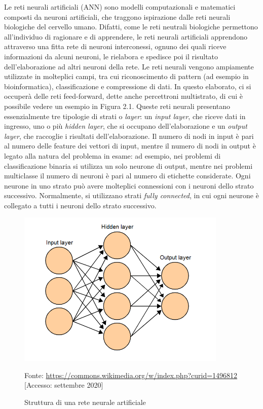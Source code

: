 \documentclass[11pt,  oneside, openany]{book}
\newcommand{\source}[1]{\caption*{Fonte: {#1}} }
\begin{document}
Le reti neurali artificiali (ANN) sono modelli computazionali e matematici composti da neuroni artificiali, che traggono ispirazione dalle reti neurali biologiche del cervello umano. Difatti, come le reti neutrali biologiche permettono all'individuo di ragionare e di apprendere, le reti neurali artificiali apprendono attraverso una fitta rete di neuroni interconessi, ognuno dei quali riceve informazioni da alcuni neuroni, le rielabora e spedisce poi il risultato dell'elaborazione ad altri neuroni della rete. Le reti neurali vengono ampiamente utilizzate in molteplici campi, tra cui riconoscimento di pattern (ad esempio in bioinformatica), classificazione e compressione di dati. In questo elaborato, ci si occuperà delle reti feed-forward, dette anche percettroni multistrato, di cui è possibile vedere  un esempio in Figura 2.1. Queste reti neurali presentano essenzialmente tre tipologie di strati o \textit{layer}: un \textit{input layer}, che riceve dati in ingresso, uno o più \textit{hidden layer}, che si occupano dell'elaborazione e un \textit{output layer}, che raccoglie i risultati dell'elaborazione. Il numero di nodi in input è pari al numero delle feature dei vettori di input, mentre il numero di nodi in output è legato alla natura del problema in esame: ad esempio, nei problemi di classificazione binaria si utilizza un solo neurone di output, mentre nei problemi multiclasse il numero di neuroni è pari al numero di etichette considerate.  Ogni neurone in uno strato può avere molteplici connessioni con i neuroni dello strato successivo. Normalmente, si utilizzano strati \textit{fully connected}, in cui ogni neurone è collegato a tutti i neuroni dello strato successivo. 

\begin{figure}[h!]
\begin{center}
  \includegraphics[width=10cm]{Immagini/ReteNeurale.png}\\
  \caption{Struttura di una rete neurale artificiale}
  \source{\url{https://commons.wikimedia.org/w/index.php?curid=1496812} [Accesso: settembre 2020]}
\end{center}
\end{figure}
\end{document}

